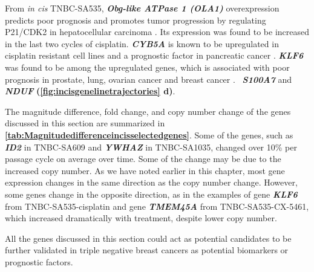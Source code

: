 From \textit{in cis} TNBC-SA535, \textit{\textbf{Obg-like ATPase 1 (OLA1)}} overexpression predicts poor prognosis and promotes tumor progression by regulating P21/CDK2 in hepatocellular carcinoma \cite{huang2020obg}. Its expression was found to be increased in the last two cycles of cisplatin. 
\textit{\textbf{CYB5A}} is known to be upregulated in cisplatin resistant cell lines and a prognostic factor in pancreatic cancer
\cite{OT27844, giovannetti2014role}.
\textit{\textbf{KLF6}} was found to be among the upregulated genes, which is associated with poor prognosis in prostate, lung, ovarian cancer and 
breast cancer \cite{hatami2013klf6,difeo2009role}. \
\textit{\textbf{S100A7}} 
\cite{zhang2019clinical, mayama2018olfm} and \textit{\textbf{NDUF}} 
\cite{li2015down} \textbf{(\autoref{fig:incisgenelinetrajectories} d)}. 

The magnitude difference, fold change,  and copy number change of the genes discussed in this section are summarized in \textbf{\autoref{tab:Magnitudedifferenceincisselectedgenes}}. Some of the genes, such as \textit{\textbf{ID2}} in TNBC-SA609 and \textit{\textbf{YWHAZ}} in TNBC-SA1035, changed over 10\% per passage cycle on average over time. Some of the change may be due to the increased copy number. As we have noted earlier in this chapter, most gene expression changes in the same direction as the copy number change. However, some genes change in the opposite direction, as in the examples of gene \textit{\textbf{KLF6}} from TNBC-SA535-cisplatin and gene \textit{\textbf{TMEM45A}} from TNBC-SA535-CX-5461, which increased dramatically with treatment, despite lower copy number. 

All the genes discussed in this section could act as potential candidates to be further validated in triple negative breast cancers as potential biomarkers or prognostic factors.

